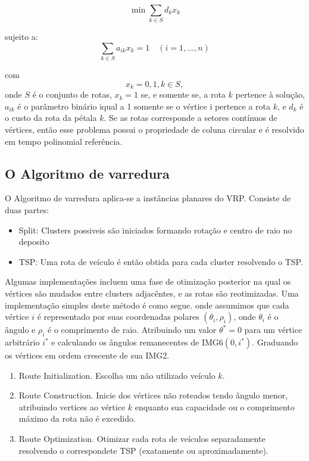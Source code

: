  \[\min \sum_{k\in S} d_k x_k\]

sujeito a:
 \[\sum_{k\in S} a_{ik} x_k = 1 \quad (i=1, \ldots, n)\]

com 
 \[x_k = {0,1}, k\in S,\]
 onde $S$ é o conjunto de rotas, $x_k=1$ se, e somente se, a rota $k$ pertence à solução, $a_{ik}$ é
o parâmetro binário iqual a 1 somente se o vértice i pertence a rota $k$, e $d_k$ é o custo da rota
da pétala $k$. Se as rotas corresponde a setores contínuos de vértices, então esse problema possui o
propriedade de coluna circular e é resolvido em tempo polinomial {\color{red} referência}.

\subsection{O Algoritmo de varredura}

 O Algoritmo de varredura aplica-se a instâncias planares do VRP. Consiste de duas partes:

\begin{itemize}
\item Split: Clusters possiveis são iniciados formando rotação e centro de raio no deposito
\item TSP: Uma rota de veículo é então obtida para cada cluster resolvendo o TSP.
\end{itemize}

 Algumas implementações incluem uma fase de otimização posterior na qual os vértices são mudados
entre clusters adjacêntes, e as rotas são reotimizadas. Uma implementação simples deste método
é como segue. onde assumimos que cada vértice $i$ é representado por suas coordenadas polares
$(\theta_i, \rho_i)$, onde $\theta_i$ é o ângulo e $\rho_i$ é o comprimento de raio. Atribuindo um
valor $\theta^* = 0$ para um vértice arbitrário $i^*$ e calculando os ângulos remanecentes de
IMG6$(0,i^*)$. Graduando os vértices em ordem crescente de sua IMG2.

\begin{enumerate}
\item Route Initialization. Escolha um não utilizado veículo $k$.
\item Route Construction. Inicie dos vértices não roteados tendo ângulo menor, atribuindo vertices
ao vértice $k$ enquanto sua capacidade ou o comprimento máximo da rota não é excedido.
\item Route Optimization. Otimizar cada rota de veículos separadamente resolvendo o correspondete
TSP (exatamente ou aproximadamente).
\end{enumerate}


